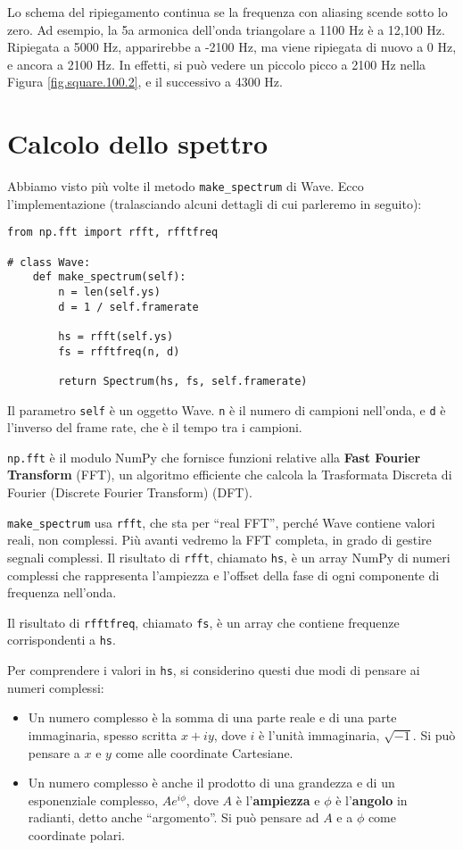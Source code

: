 \documentclass[12pt,a4paper]{book}
\begin{document}
Lo schema del ripiegamento continua se la frequenza con aliasing scende sotto lo zero. Ad esempio, la 5a armonica dell'onda triangolare a 1100 Hz è a 12,100 Hz. Ripiegata a 5000 Hz, apparirebbe a -2100 Hz, ma viene ripiegata di nuovo a 0 Hz, e ancora a 2100 Hz. In effetti, si può vedere un piccolo picco a 2100 Hz nella Figura \ref{fig.square.100.2}, e il successivo a 4300 Hz.

\section{Calcolo dello spettro} 

Abbiamo visto più volte il metodo \verb"make_spectrum" di Wave. Ecco l'implementazione (tralasciando alcuni dettagli di cui parleremo in seguito):

\begin{verbatim} 
from np.fft import rfft, rfftfreq

# class Wave:
    def make_spectrum(self):
        n = len(self.ys)
        d = 1 / self.framerate

        hs = rfft(self.ys)
        fs = rfftfreq(n, d)

        return Spectrum(hs, fs, self.framerate)
 \end{verbatim} 

Il parametro {\tt self} è un oggetto Wave. {\tt n} è il numero di campioni nell'onda, e {\tt d} è l'inverso del frame rate, che è il tempo tra i campioni.

{\tt np.fft} è il modulo NumPy che fornisce funzioni relative alla {\bf Fast Fourier Transform} (FFT), un algoritmo efficiente che calcola la Trasformata Discreta di Fourier (Discrete Fourier Transform) (DFT).

\verb"make_spectrum" usa {\tt rfft}, che sta per ``real FFT'', perché Wave contiene valori reali, non complessi. Più avanti vedremo la FFT completa, in grado di gestire segnali complessi. Il risultato di {\tt rfft}, chiamato {\tt hs}, è un array NumPy di numeri complessi che rappresenta l'ampiezza e l'offset della fase di ogni componente di frequenza nell'onda.

Il risultato di {\tt rfftfreq}, chiamato {\tt fs}, è un array che contiene frequenze corrispondenti a {\tt hs}.

Per comprendere i valori in {\tt hs}, si considerino questi due modi di pensare ai numeri complessi:

\begin{itemize} 

\item Un numero complesso è la somma di una parte reale e di una parte immaginaria, spesso scritta $x + iy$, dove $i$ è l'unità immaginaria, $\sqrt{-1}$. Si può pensare a $x$ e $y$ come alle coordinate Cartesiane.

\item Un numero complesso è anche il prodotto di una grandezza e di un esponenziale complesso, $A e^{i \phi}$, dove $A$ è l'{\bf ampiezza} e $\phi$ è l'{\bf angolo} in radianti, detto anche ``argomento''. Si può pensare ad $A$ e a $\phi$ come coordinate polari.

\end{itemize} 
\end{document}

